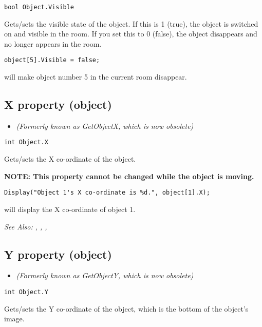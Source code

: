 \begin{verbatim}
bool Object.Visible
\end{verbatim}
Gets/sets the visible state of the object. If this is 1 (true), the object is switched on
and visible in the room. If you set this to 0 (false), the object disappears and no longer
appears in the room.

\begin{verbatim}
object[5].Visible = false;
\end{verbatim}
will make object number 5 in the current room disappear.


\subsection{X property (object)}\label{Object.X}%

\begin{itemize}
\item \it{(Formerly known as GetObjectX, which is now obsolete)}
\end{itemize}

\begin{verbatim}
int Object.X
\end{verbatim}
Gets/sets the X co-ordinate of the object.

\bf{NOTE:} This property cannot be changed while the object is moving.

\begin{verbatim}
Display("Object 1's X co-ordinate is %d.", object[1].X);
\end{verbatim}
will display the X co-ordinate of object 1.

\it{See Also:} , ,
, 


\subsection{Y property (object)}\label{Object.Y}%

\begin{itemize}
\item \it{(Formerly known as GetObjectY, which is now obsolete)}
\end{itemize}

\begin{verbatim}
int Object.Y
\end{verbatim}
Gets/sets the Y co-ordinate of the object, which is the bottom of the object's image.

